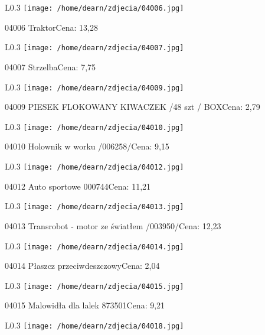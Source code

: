 \begin{wrapfigure}{L}{0.3\textwidth}
\texttt{[image: /home/dearn/zdjecia/04006.jpg]}
\end{wrapfigure}
04006 TraktorCena: 13,28\newline
\begin{wrapfigure}{L}{0.3\textwidth}
\texttt{[image: /home/dearn/zdjecia/04007.jpg]}
\end{wrapfigure}
04007 StrzelbaCena: 7,75\newline
\begin{wrapfigure}{L}{0.3\textwidth}
\texttt{[image: /home/dearn/zdjecia/04009.jpg]}
\end{wrapfigure}
04009 PIESEK FLOKOWANY KIWACZEK /48 szt / BOXCena: 2,79\newline
\begin{wrapfigure}{L}{0.3\textwidth}
\texttt{[image: /home/dearn/zdjecia/04010.jpg]}
\end{wrapfigure}
04010 Holownik w worku /006258/Cena: 9,15\newline
\begin{wrapfigure}{L}{0.3\textwidth}
\texttt{[image: /home/dearn/zdjecia/04012.jpg]}
\end{wrapfigure}
04012 Auto sportowe 000744Cena: 11,21\newline
\begin{wrapfigure}{L}{0.3\textwidth}
\texttt{[image: /home/dearn/zdjecia/04013.jpg]}
\end{wrapfigure}
04013 Transrobot - motor ze światłem /003950/Cena: 12,23\newline
\begin{wrapfigure}{L}{0.3\textwidth}
\texttt{[image: /home/dearn/zdjecia/04014.jpg]}
\end{wrapfigure}
04014 Płaszcz przeciwdeszczowyCena: 2,04\newline
\begin{wrapfigure}{L}{0.3\textwidth}
\texttt{[image: /home/dearn/zdjecia/04015.jpg]}
\end{wrapfigure}
04015 Malowidła dla lalek 873501Cena: 9,21\newline
\begin{wrapfigure}{L}{0.3\textwidth}
\texttt{[image: /home/dearn/zdjecia/04018.jpg]}
\end{wrapfigure}
